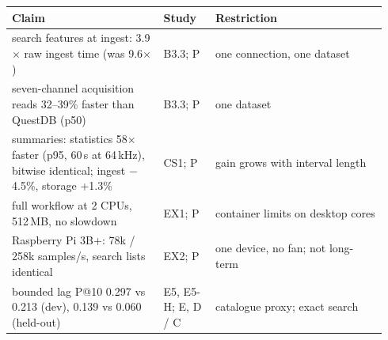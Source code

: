 \documentclass[sigconf]{acmart}
\begin{document}
\medskip\noindent
\begin{longtable}{@{}>{\raggedright\arraybackslash}p{0.38\linewidth}p{0.13\linewidth}>{\raggedright\arraybackslash}p{0.43\linewidth}@{}}
\toprule
Claim & Study & Restriction \\
\midrule\endhead
search features at ingest: 3.9$\times$ raw ingest time (was 9.6$\times$) & B3.3; P & one connection, one dataset \\
seven-channel acquisition reads 32--39\% faster than QuestDB (p50) & B3.3; P & one dataset \\
summaries: statistics 58$\times$ faster (p95, 60\,s at 64\,kHz), bitwise identical; ingest $-$4.5\%, storage +1.3\% & CS1; P & gain grows with interval length \\
full workflow at 2 CPUs, 512\,MB, no slowdown & EX1; P & container limits on desktop cores \\
Raspberry Pi 3B+: 78k / 258k samples/s, search lists identical & EX2; P & one device, no fan; not long-term \\
bounded lag P@10 0.297 vs 0.213 (dev), 0.139 vs 0.060 (held-out) & E5, E5-H; E, D / C & catalogue proxy; exact search \\
\bottomrule
\end{longtable}

\fi
\end{document}

